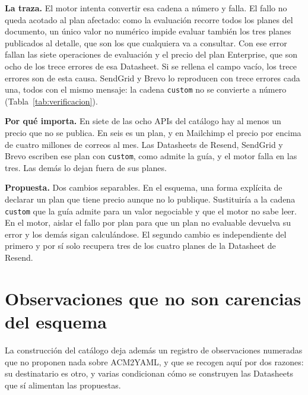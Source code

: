 \textbf{La traza.} El motor intenta convertir esa cadena a número y falla. El
fallo no queda acotado al plan afectado: como la evaluación recorre todos los
planes del documento, un único valor no numérico impide evaluar también los tres
planes publicados al detalle, que son los que cualquiera va a consultar.
Con ese error fallan las siete operaciones de evaluación y el precio del plan Enterprise, que son ocho
de los trece errores de esa Datasheet. Si se rellena el campo vacío, los trece errores son de esta causa.
SendGrid y Brevo lo reproducen con trece errores cada una, todos con el mismo mensaje: la cadena \texttt{custom} no se convierte a número (Tabla~\ref{tab:verificacion}).

\textbf{Por qué importa.} En siete de las ocho APIs del catálogo hay al menos un precio que no se publica.
En seis es un plan, y en Mailchimp el precio por encima de cuatro millones de correos al mes.
Las Datasheets de Resend, SendGrid y Brevo escriben ese plan con \texttt{custom}, como admite la guía, y el motor falla en las tres.
Las demás lo dejan fuera de sus planes.

\textbf{Propuesta.} Dos cambios separables.
En el esquema, una forma explícita de declarar un plan que tiene precio aunque no lo publique.
Sustituiría a la cadena \texttt{custom} que la guía admite para un valor negociable y que el motor no sabe leer.
En el motor, aislar el fallo por plan para que un plan no evaluable devuelva su error y los demás sigan calculándose.
El segundo cambio es independiente del primero y por sí solo recupera tres de los cuatro planes de la Datasheet de Resend.

\section{Observaciones que no son carencias del esquema}
\label{sec:evolucion:observaciones}

La construcción del catálogo deja además un registro de observaciones numeradas
que no proponen nada sobre ACM2YAML, y que se recogen aquí por dos razones: su
destinatario es otro, y varias condicionan cómo se construyen las Datasheets que
sí alimentan las propuestas.

